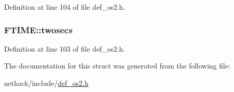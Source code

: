 Definition at line 104 of file def\+\_\+os2.\+h.

\hypertarget{structFTIME_ac2d7f6ea59ca1edbb4b4ae035f4a8d5b}{
\subsubsection[{twosecs}]{ F\+T\+I\+M\+E\+::twosecs}}\label{structFTIME_ac2d7f6ea59ca1edbb4b4ae035f4a8d5b}


Definition at line 103 of file def\+\_\+os2.\+h.



The documentation for this struct was generated from the following file\+:\begin{DoxyCompactItemize}
\item 
nethack/include/\hyperlink{def__os2_8h}{def\+\_\+os2.\+h}\end{DoxyCompactItemize}

